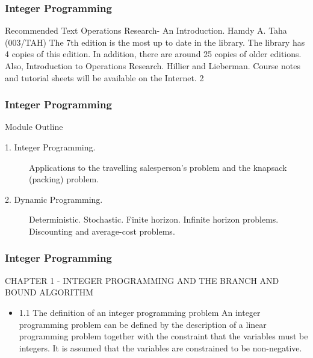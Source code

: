 \documentclass{beamer}
\begin{document}
\begin{frame} 
\frametitle{Integer Programming}     
Recommended Text
Operations Research- An Introduction. Hamdy A. Taha
(003/TAH)
The 7th edition is the most up to date in the library. The library
has 4 copies of this edition. In addition, there are around 25 copies
of older editions. Also,
Introduction to Operations Research. Hillier and Lieberman.
Course notes and tutorial sheets will be available on the Internet.
2 
\end{frame}  
\begin{frame} 
\frametitle{Integer Programming}     
Module Outline
\begin{description}
\item[1. Integer Programming.] Applications to the travelling
salesperson’s problem and the knapsack (packing) problem.
\item[2. Dynamic Programming.] Deterministic. Stochastic. Finite
horizon. Infinite horizon problems. Discounting and average-cost
problems.
\end{description}
\end{frame} 
\begin{frame} 
\frametitle{Integer Programming}     
CHAPTER 1 - INTEGER PROGRAMMING AND THE
BRANCH AND BOUND ALGORITHM
\begin{itemize}
\item 1.1 The definition of an integer programming problem
An integer programming problem can be defined by the description
of a linear programming problem together with the constraint that
the variables must be integers. It is assumed that the variables are
constrained to be non-negative.
\end{itemize}
\end{frame}  
\end{document}
